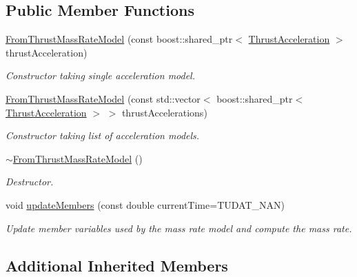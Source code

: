 \subsection*{Public Member Functions}
\begin{DoxyCompactItemize}
\item 
\hyperlink{classtudat_1_1propulsion_1_1FromThrustMassRateModel_ae9111d9f6dd0d78a23e62656852b7d68}{From\+Thrust\+Mass\+Rate\+Model} (const boost\+::shared\+\_\+ptr$<$ \hyperlink{classtudat_1_1propulsion_1_1ThrustAcceleration}{Thrust\+Acceleration} $>$ thrust\+Acceleration)
\begin{DoxyCompactList}\small\item\em Constructor taking single acceleration model. \end{DoxyCompactList}\item 
\hyperlink{classtudat_1_1propulsion_1_1FromThrustMassRateModel_a692f1b4035aa747e731629753d268481}{From\+Thrust\+Mass\+Rate\+Model} (const std\+::vector$<$ boost\+::shared\+\_\+ptr$<$ \hyperlink{classtudat_1_1propulsion_1_1ThrustAcceleration}{Thrust\+Acceleration} $>$ $>$ thrust\+Accelerations)
\begin{DoxyCompactList}\small\item\em Constructor taking list of acceleration models. \end{DoxyCompactList}\item 
\hyperlink{classtudat_1_1propulsion_1_1FromThrustMassRateModel_adc6d43d81a86425a324568dce822f5ea}{$\sim$\+From\+Thrust\+Mass\+Rate\+Model} ()\hypertarget{classtudat_1_1propulsion_1_1FromThrustMassRateModel_adc6d43d81a86425a324568dce822f5ea}{}\label{classtudat_1_1propulsion_1_1FromThrustMassRateModel_adc6d43d81a86425a324568dce822f5ea}

\begin{DoxyCompactList}\small\item\em Destructor. \end{DoxyCompactList}\item 
void \hyperlink{classtudat_1_1propulsion_1_1FromThrustMassRateModel_abc3aa103c5d58b1ddbb224786b6c0ff9}{update\+Members} (const double current\+Time=T\+U\+D\+A\+T\+\_\+\+N\+AN)
\begin{DoxyCompactList}\small\item\em Update member variables used by the mass rate model and compute the mass rate. \end{DoxyCompactList}\end{DoxyCompactItemize}
\subsection*{Additional Inherited Members}


